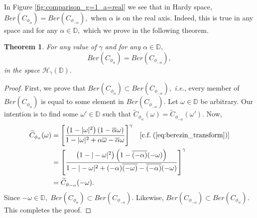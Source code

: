 \documentclass[12pt, reqno]{amsart}
\newtheorem{theorem}{Theorem}[section]
\theoremstyle{definition}
\theoremstyle{remark}
\numberwithin{equation}{section}
\newcommand{\D}{\mathbb{D}}
\newcommand{\g}{\gamma}
\renewcommand{\a}{\alpha}
\renewcommand{\o}{\omega}
\begin{document}
    In Figure \ref{fig:comparison_g=1_a=real} we see that in Hardy space, $Ber\left(C_{\phi_\alpha}\right)=Ber\left(C_{\phi_{-\alpha}}\right),$ when $\alpha$ is on the real axis. Indeed, this is true in any space and for any $\alpha \in \D,$ which we prove in the following theorem.
    \begin{theorem}\label{positive=negative}
    For any value of $\g$ and for any $\alpha \in \D,$
    \begin{equation}        Ber\left(C_{\phi_\alpha}\right)=Ber\left(C_{\phi_{-\alpha}}\right),
    \end{equation}
    in the space $\mathcal{H}_\g(\D).$
    \end{theorem}
    \begin{proof}
        First, we prove that $Ber\left(C_{\phi_\alpha}\right)\subset Ber\left(C_{\phi_{-\alpha}}\right),$ {\it i.e.}, every member of $Ber\left(C_{\phi_\alpha}\right)$ is equal to some element in $Ber\left(C_{\phi_{-\alpha}}\right).$ Let $\omega \in \D$ be arbitrary. Our intention is to find some $\omega '\in \D$ such that $\widetilde{C}_{\phi_\alpha}(\omega)=\widetilde{C}_{\phi_{-\alpha}}(\omega').$ Now,
        \begin{equation*}
            \begin{split}
                \widetilde{C}_{\phi_\alpha}(\omega)&=\left[\dfrac{\left(1-|\o|^2\right)\left(1-\overline{\a}\o\right)}{1-|\o|^2+\a\overline{\o}-\overline{\a}\o}\right]^\g\;\;\;[\mbox{c.f.}\;(\ref{eq:berezin_transform})]\\
                &=\left[\dfrac{\left(1-|-\o|^2\right)\left(1-\overline{(-\a)}(-\o)\right)}{1-|-\o|^2+(-\a)\overline{(-\o)}-\overline{(-\a)}(-\o)}\right]^\g \\
                &=\widetilde{C}_{\phi_{-\alpha}}(-\omega).
            \end{split}
        \end{equation*}
        Since $-\omega \in \D,\;Ber\left(C_{\phi_\alpha}\right)\subset Ber\left(C_{\phi_{-\alpha}}\right).$ Likewise, $Ber\left(C_{\phi_{-\alpha}}\right)\subset Ber\left(C_{\phi_{\alpha}}\right).$ This completes the proof.
    \end{proof}










\end{document}
